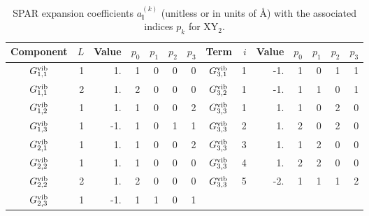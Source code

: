 \begin{table}[h]
    \centering
    \footnotesize
    \caption{SPAR expansion coefficients $a^{(k)}_{\bm{l}}$ (unitless or in units of \AA) with the associated indices $p_k$ for XY$_2$. }
        \label{table:KEO:XY2:vib}
    \begin{tabular}{crrrrrrcrrrrrr}
    \hline
    \hline
        Component  & $L$ & Value & ${p}_0$ & ${p}_1$ & ${p}_2$ & ${p}_3$ & Term  & $i$ & Value & ${p}_0$ & ${p}_1$ & ${p}_2$ & ${p}_3$ \\
    \hline
$  G^{\rm vib}_{     1,    1}$   &    1 &         1. &    1 &    0 &    0 &    0 &  $  G^{\rm vib}_{    3,   1}$   &    1 &   -1. &    1 &    0 &    1 &    1 \\
$  G^{\rm vib}_{     1,    1}$   &    2 &         1. &    2 &    0 &    0 &    0 &  $  G^{\rm vib}_{    3,   2}$   &    1 &   -1. &    1 &    1 &    0 &    1 \\
$  G^{\rm vib}_{     1,    2}$   &    1 &         1. &    1 &    0 &    0 &    2 &  $  G^{\rm vib}_{    3,   3}$   &    1 &    1. &    1 &    0 &    2 &    0 \\
$  G^{\rm vib}_{     1,    3}$   &    1 &        -1. &    1 &    0 &    1 &    1 &  $  G^{\rm vib}_{    3,   3}$   &    2 &    1. &    2 &    0 &    2 &    0 \\
$  G^{\rm vib}_{     2,    1}$   &    1 &         1. &    1 &    0 &    0 &    2 &  $  G^{\rm vib}_{    3,   3}$   &    3 &    1. &    1 &    2 &    0 &    0 \\
$  G^{\rm vib}_{     2,    2}$   &    1 &         1. &    1 &    0 &    0 &    0 &  $  G^{\rm vib}_{    3,   3}$   &    4 &    1. &    2 &    2 &    0 &    0 \\
$  G^{\rm vib}_{     2,    2}$   &    2 &         1. &    2 &    0 &    0 &    0 &  $  G^{\rm vib}_{    3,   3}$   &    5 &   -2. &    1 &    1 &    1 &    2 \\
$  G^{\rm vib}_{     2,    3}$   &    1 &        -1. &    1 &    1 &    0 &    1\\
\hline
\hline
    \end{tabular}
\end{table}